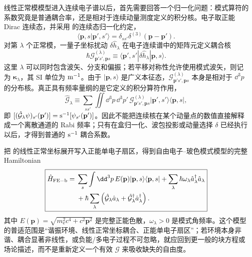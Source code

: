 线性正常模模型进入连续电子谱以后，首先需要回答一个归一化问题：模式算符的系数究竟是普通耦合率，还是相对于连续动量测度定义的积分核。电子取正能 Dirac 连续态，并采用 的连续态归一化约定，
\[
\langle\mathbf p,s|\mathbf p',s'\rangle
=\delta_{ss'}\delta^{(3)}(\mathbf p-\mathbf p').
\]
对第 $\lambda$ 个正常模，一量子坐标扰动 $\delta\hat h_\lambda$ 在电子连续谱中的矩阵元定义耦合核
\begin{equation}
\boxed{
\hbar\mathcal G^{(\lambda)}_{\mathbf p's',\mathbf ps}
\equiv
\langle\mathbf p',s'|\delta\hat h_\lambda|\mathbf p,s\rangle.}
\label{eq:general_free_electron_mode_coupling_definition}
\end{equation}
这里 $\lambda$ 可以同时包含波矢、分支和偏振；若平移对称性允许使用模式波矢，则记为 $\boldsymbol\kappa_\lambda$，其 SI 单位为 ${\rm m^{-1}}$。由于 $|\mathbf p,s\rangle$ 是广义本征态，$\mathcal G^{(\lambda)}_{\mathbf p's',\mathbf ps}$ 本身是相对于 $\dd^3 p$ 的分布核。真正具有频率量纲的是它定义的积分算符作用，
\begin{equation}
\boxed{
\hat{\mathcal G}_\lambda
\equiv
\sum_{ss'}\iint\dd^3 p\,\dd^3 p'\,
\mathcal G^{(\lambda)}_{\mathbf p's',\mathbf ps}
|\mathbf p',s'\rangle\langle\mathbf p,s|,}
\label{eq:general_mode_coupling_operator}
\end{equation}
即 $[(\hat{\mathcal G}_\lambda\psi)_{s'}(\mathbf p')]={\rm s^{-1}}[\psi_{s'}(\mathbf p')]$。因此不能把连续核在某个动量点的数值直接解释成一个离散通道的 Rabi 频率；只有在盒归一化、波包投影或动量选择 $\delta$ 已经执行以后，才得到普通的 ${\rm s^{-1}}$ 耦合系数。

把 的线性正常坐标展开写入正能单电子扇区，得到自由电子--玻色模式模型的完整 Hamiltonian
\begin{equation}
\boxed{
\begin{aligned}
\hat H_{\rm FE-b}
={}&\sum_s\int\dd^3 p\,E(\mathbf p)|\mathbf p,s\rangle\langle\mathbf p,s|
+\sum_\lambda\hbar\omega_\lambda \hat a_\lambda^\dagger\hat a_\lambda\\
&+\hbar\sum_\lambda
\left(\hat{\mathcal G}_\lambda\hat a_\lambda
+\hat{\mathcal G}_\lambda^\dagger\hat a_\lambda^\dagger\right).
\end{aligned}}
\label{eq:universal_free_electron_boson_hamiltonian}
\end{equation}
其中 $E(\mathbf p)=\sqrt{m_{\mathrm e}^2c^4+c^2\mathbf p^2}$ 是完整正能色散，$\omega_\lambda>0$ 是模式角频率。这个模型的普适范围是“谐振环境、线性正常坐标耦合、正能单电子扇区”；若环境本身非谐、耦合显著非线性，或负能/多电子过程不可忽略，就应回到更一般的块方程或场论描述，而不是重新定义一个有效 $\mathcal G$ 来吸收缺失的自由度。

